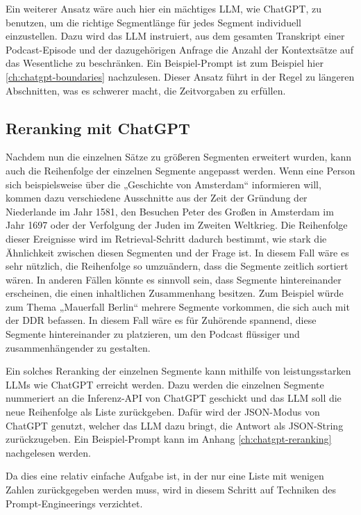 Ein weiterer Ansatz wäre auch hier ein mächtiges LLM, wie ChatGPT, zu benutzen, um die richtige Segmentlänge für jedes Segment individuell einzustellen.
Dazu wird das LLM instruiert, aus dem gesamten Transkript einer Podcast-Episode und der dazugehörigen Anfrage die Anzahl der Kontextsätze auf das Wesentliche zu beschränken.
Ein Beispiel-Prompt ist zum Beispiel hier \ref{ch:chatgpt-boundaries} nachzulesen.
Dieser Ansatz führt in der Regel zu längeren Abschnitten, was es schwerer macht, die Zeitvorgaben zu erfüllen.

\subsection{Reranking mit ChatGPT}

Nachdem nun die einzelnen Sätze zu größeren Segmenten erweitert wurden, kann auch die Reihenfolge der einzelnen Segmente angepasst werden.
Wenn eine Person sich beispielsweise über die „Geschichte von Amsterdam“ informieren will, kommen dazu verschiedene Ausschnitte aus der Zeit der Gründung der Niederlande im Jahr 1581, den Besuchen Peter des Großen in Amsterdam im Jahr 1697 oder der Verfolgung der Juden im Zweiten Weltkrieg.
Die Reihenfolge dieser Ereignisse wird im Retrieval-Schritt dadurch bestimmt, wie stark die Ähnlichkeit zwischen diesen Segmenten und der Frage ist.
In diesem Fall wäre es sehr nützlich, die Reihenfolge so umzuändern, dass die Segmente zeitlich sortiert wären.
In anderen Fällen könnte es sinnvoll sein, dass Segmente hintereinander erscheinen, die einen inhaltlichen Zusammenhang besitzen.
Zum Beispiel würde zum Thema „Mauerfall Berlin“ mehrere Segmente vorkommen, die sich auch mit der DDR befassen.
In diesem Fall wäre es für Zuhörende spannend, diese Segmente hintereinander zu platzieren, um den Podcast flüssiger und zusammenhängender zu gestalten.

Ein solches Reranking der einzelnen Segmente kann mithilfe von leistungsstarken LLMs wie ChatGPT erreicht werden.
Dazu werden die einzelnen Segmente nummeriert an die Inferenz-API von ChatGPT geschickt und das LLM soll die neue Reihenfolge als Liste zurückgeben.
Dafür wird der JSON-Modus von ChatGPT genutzt, welcher das LLM dazu bringt, die Antwort als JSON-String zurückzugeben.
Ein Beispiel-Prompt kann im Anhang \ref{ch:chatgpt-reranking} nachgelesen werden.

Da dies eine relativ einfache Aufgabe ist, in der nur eine Liste mit wenigen Zahlen zurückgegeben werden muss, wird in diesem Schritt auf Techniken des Prompt-Engineerings verzichtet.


